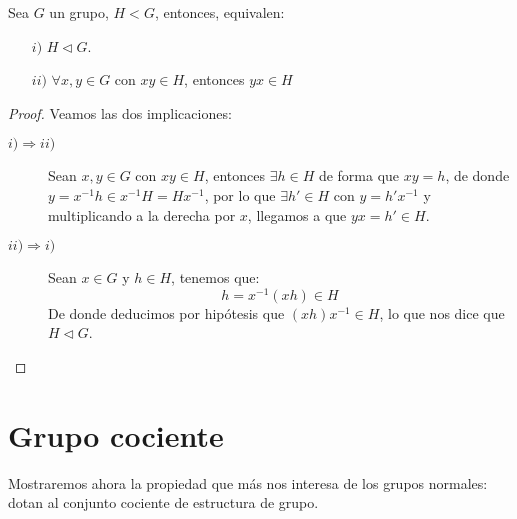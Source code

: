 \begin{prop}
    Sea $G$ un grupo, $H<G$, entonces, equivalen:
    \begin{enumerate}
        \item[$i)$] $H\lhd G$.
        \item[$ii)$] $\forall x,y\in G \text{\ con\ } xy \in H$, entonces $yx \in H$
    \end{enumerate}
    \begin{proof}
        Veamos las dos implicaciones:
        \begin{description}
            \item [$i)\Longrightarrow ii)$] Sean $x,y\in G$ con $xy\in H$, entonces $\exists h\in H$ de forma que $xy = h$, de donde $y = x^{-1}h \in x^{-1}H = Hx^{-1}$, por lo que $\exists h'\in H$ con $y = h'x^{-1}$ y multiplicando a la derecha por $x$, llegamos a que $yx = h' \in H$.
            \item [$ii)\Longrightarrow i)$] Sean $x\in G$ y $h\in H$, tenemos que:
                \begin{equation*}
                    h = x^{-1}(xh) \in H
                \end{equation*}
                De donde deducimos por hipótesis que $(xh)x^{-1} \in H$, lo que nos dice que $H\lhd G$.\qedhere
        \end{description}
    \end{proof}
\end{prop}

\section{Grupo cociente}
\noindent
Mostraremos ahora la propiedad que más nos interesa de los grupos normales: dotan al conjunto cociente de estructura de grupo.

